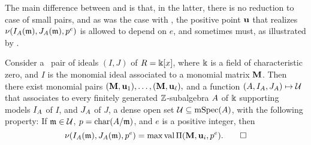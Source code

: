 \documentclass{amsart}
\begin{document}
The main difference between   and   is that, in the latter, there is no reduction to case of small pairs, and as was the case with  , the positive point $\mathbf{u}$ that realizes $\nu(I_A(\mathfrak{m}), J_A(\mathfrak{m}), p^e)$ is allowed to depend on $e$, and sometimes must, as illustrated by .

\begin{theorem}
   \label{nu invariants associated to a monomial ideal in large characteristic: T}   
   Consider a \compatible\ pair of ideals $(I,J)$ of $R=\Bbbk[x]$, where $\Bbbk$ is a field of characteristic zero, and $I$ is the monomial ideal associated to a monomial matrix $\mathbf{M}$.  Then there exist monomial pairs $(\mathbf{M}, \mathbf{u}_1),  \ldots, (\mathbf{M}, \mathbf{u}_{\ell}),$ and a function $(A, I_A, J_A) \mapsto \mathcal{U}$  that associates to every finitely generated $\mathbb{Z}$-subalgebra $A$ of $\Bbbk$ supporting models $I_A$ of $I$, and $J_A$ of $J$, a dense open set $\mathcal{U} \subseteq \operatorname{mSpec}(A)$, with the following property\textup:
   If $\mathfrak{m} \in \mathcal{U}$, $p = \operatorname{char}(A/\mathfrak{m})$, and $e$ is a positive integer, then 
   \[
      \nu(I_A(\mathfrak{m}), J_A(\mathfrak{m}), p^e) = \max \operatorname{val} \Pi (\mathbf{M}, \mathbf{u}_i, p^e).
      \qed
   \]
\end{theorem}

\newpage

{\small


}
\end{document}
